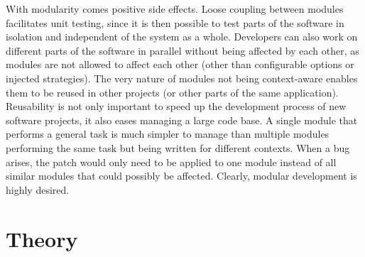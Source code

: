 \documentclass[a4paper,11pt]{kth-mag}
\begin{document}
        With modularity comes positive side effects.
        Loose coupling between modules facilitates unit testing, since it is then possible to test parts of the software in isolation and independent of the system as a whole.
        Developers can also work on different parts of the software in parallel without being affected by each other, as modules are not allowed to affect each other (other than configurable options or injected strategies).
        The very nature of modules not being context-aware enables them to be reused in other projects (or other parts of the same application).
        Reusability is not only important to speed up the development process of new software projects, it also eases managing a large code base.
        A single module that performs a general task is much simpler to manage than multiple modules performing the same task but being written for different contexts.
        When a bug arises, the patch would only need to be applied to one module instead of all similar modules that could possibly be affected.
        Clearly, modular development is highly desired.
  \part{Theory}\label{part:theory}
\end{document}
